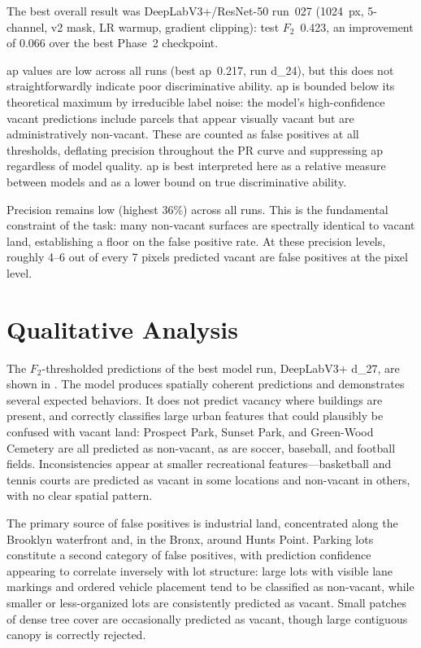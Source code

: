 The best overall result was DeepLabV3+/ResNet-50 run~027 (1024~px, 5-channel, v2 mask, LR warmup, gradient clipping): test $F_2$~0.423, an improvement of 0.066 over the best Phase~2 checkpoint.

\acrshort{ap} values are low across all runs (best \acrshort{ap}~0.217, run d\_24), but this does not straightforwardly indicate poor discriminative ability. \acrshort{ap} is bounded below its theoretical maximum by irreducible label noise: the model's high-confidence vacant predictions include parcels that appear visually vacant but are administratively non-vacant. These are counted as false positives at all thresholds, deflating precision throughout the PR curve and suppressing \acrshort{ap} regardless of model quality. \acrshort{ap} is best interpreted here as a relative measure between models and as a lower bound on true discriminative ability.

Precision remains low (highest 36\%) across all runs. This is the fundamental constraint of the task: many non-vacant surfaces are spectrally identical to vacant land, establishing a floor on the false positive rate. At these precision levels, roughly 4--6 out of every 7 pixels predicted vacant are false positives at the pixel level.

\section{Qualitative Analysis}
\label{sec:qualitative}

The $F_2$-thresholded predictions of the best model run, DeepLabV3+ d\_27, are shown in . The model produces spatially coherent predictions and demonstrates several expected behaviors. It does not predict vacancy where buildings are present, and correctly classifies large urban features that could plausibly be confused with vacant land: Prospect Park, Sunset Park, and Green-Wood Cemetery are all predicted as non-vacant, as are soccer, baseball, and football fields. Inconsistencies appear at smaller recreational features---basketball and tennis courts are predicted as vacant in some locations and non-vacant in others, with no clear spatial pattern.

The primary source of false positives is industrial land, concentrated along the Brooklyn waterfront and, in the Bronx, around Hunts Point. Parking lots constitute a second category of false positives, with prediction confidence appearing to correlate inversely with lot structure: large lots with visible lane markings and ordered vehicle placement tend to be classified as non-vacant, while smaller or less-organized lots are consistently predicted as vacant. Small patches of dense tree cover are occasionally predicted as vacant, though large contiguous canopy is correctly rejected.

